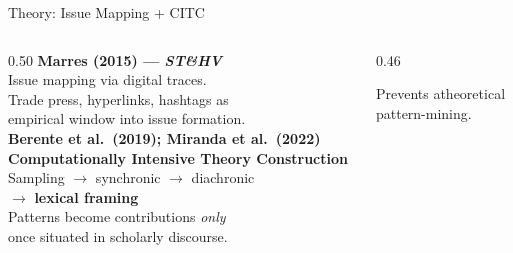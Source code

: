 \documentclass[aspectratio=169,11pt]{beamer}
\newcommand{\iconfull}[2]{\textcolor{#1}{\faIcon{#2}}}
\begin{document}
\begin{frame}{\iconfull{dcblue}{network-wired}\enspace Theory: Issue Mapping + CITC}
\begin{columns}[T]
\begin{column}{0.50\textwidth}
  \small\textbf{Marres (2015) — \textit{ST\&HV}}\\[0.3em]
  \footnotesize
  Issue mapping via digital traces.\\
  Trade press, hyperlinks, hashtags as\\
  empirical window into issue formation.\\[0.5em]
  \small\textbf{Berente et al.\ (2019); Miranda et al.\ (2022)}\\[0.2em]
  \small\textbf{Computationally Intensive Theory Construction}\\[0.3em]
  \footnotesize
  Sampling $\to$ synchronic $\to$ diachronic\\
  $\to$ \textbf{lexical framing}\\[0.3em]
  Patterns become contributions \textit{only}\\
  once situated in scholarly discourse.
\end{column}
\begin{column}{0.46\textwidth}
  \vspace{0.6em}
  \vspace{0.4em}

  \footnotesize\textcolor{dcgray}{Prevents atheoretical\\
  pattern-mining.}
\end{column}
\end{columns}
\end{frame}
\end{document}
